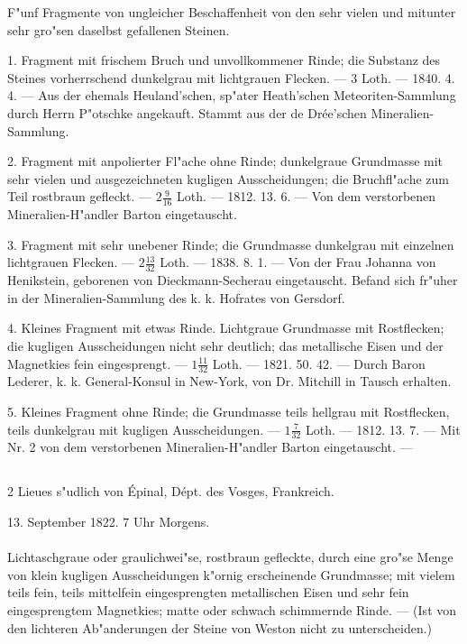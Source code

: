 \documentclass[a4paper, 11pt, oneside, polutonikogreek, german]{article}
\begin{document}
F"unf Fragmente von ungleicher Beschaffenheit von den sehr vielen und mitunter sehr gro"sen daselbst gefallenen Steinen.

1. Fragment mit frischem Bruch und unvollkommener Rinde; die Substanz des Steines vorherrschend dunkelgrau mit lichtgrauen Flecken. --- 3 Loth. --- 1840. 4. 4. --- Aus der ehemals Heuland'schen, sp"ater Heath'schen Meteoriten-Sammlung durch Herrn P"otschke angekauft. Stammt aus der de Drée'schen Mineralien-Sammlung.

2. Fragment mit anpolierter Fl"ache ohne Rinde; dunkelgraue Grundmasse mit sehr vielen und ausgezeichneten kugligen Ausscheidungen; die Bruchfl"ache zum Teil rostbraun gefleckt. --- $2\frac{9}{16}$ Loth. --- 1812. 13. 6. --- Von dem verstorbenen Mineralien-H"andler Barton eingetauscht.

3. Fragment mit sehr unebener Rinde; die Grundmasse dunkelgrau mit einzelnen lichtgrauen Flecken. --- $2\frac{13}{32}$ Loth. --- 1838. 8. 1. --- Von der Frau Johanna von Henikstein, geborenen von Dieckmann-Secherau eingetauscht. Befand sich fr"uher in der Mineralien-Sammlung des k. k. Hofrates von Gersdorf.

4. Kleines Fragment mit etwas Rinde. Lichtgraue Grundmasse mit Rostflecken; die kugligen Ausscheidungen nicht sehr deutlich; das metallische Eisen und der Magnetkies fein eingesprengt. --- $1\frac{11}{32}$ Loth. --- 1821. 50. 42. --- Durch Baron Lederer, k. k. General-Konsul in New-York, von Dr. Mitchill in Tausch erhalten.

5. Kleines Fragment ohne Rinde; die Grundmasse teils hellgrau mit Rostflecken, teils dunkelgrau mit kugligen Ausscheidungen. --- $1\frac{7}{32}$ Loth. --- 1812. 13. 7. --- Mit Nr. 2 von dem verstorbenen Mineralien-H"andler Barton eingetauscht. ---
\subsection[\frakfamily{La Baffe.}]{}
\begin{center}

2 Lieues s"udlich von Épinal, Dépt. des Vosges, Frankreich.

13. September 1822. 7 Uhr Morgens.
\end{center}
\paragraph{}
Lichtaschgraue oder graulichwei"se, rostbraun gefleckte, durch eine gro"se Menge von klein kugligen Ausscheidungen k"ornig erscheinende Grundmasse; mit vielem teils fein, teils mittelfein eingesprengten metallischen Eisen und sehr fein eingesprengtem Magnetkies; matte oder schwach schimmernde Rinde. --- (Ist von den lichteren Ab"anderungen der Steine von Weston nicht zu unterscheiden.)
\end{document}
